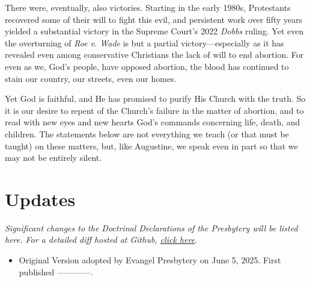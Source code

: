 \documentclass[
]{book}
\providecommand{\tightlist}{%
  \setlength{\itemsep}{0pt}\setlength{\parskip}{0pt}}
\begin{document}
There were, eventually, also victories. Starting in the early 1980s, Protestants recovered some of their will to fight this evil, and persistent work over fifty years yielded a substantial victory in the Supreme Court's 2022 \emph{Dobbs} ruling. Yet even the overturning of \emph{Roe v. Wade} is but a partial victory---especially as it has revealed even among conservative Christians the lack of will to end abortion. For even as we, God's people, have opposed abortion, the blood has continued to stain our country, our streets, even our homes.

Yet God is faithful, and He has promised to purify His Church with the truth. So it is our desire to repent of the Church's failure in the matter of abortion, and to read with new eyes and new hearts God's commands concerning life, death, and children. The statements below are not everything we teach (or that must be taught) on these matters, but, like Augustine, we speak even in part so that we may not be entirely silent.

\hypertarget{updates}{%
\chapter*{Updates}\label{updates}}

\emph{Significant changes to the Doctrinal Declarations of the Presbytery will be listed here. For a detailed diff hosted at Github, \href{https://github.com/Evangel-Presbytery/evangel-ddp}{click here}.}

\begin{itemize}
\tightlist
\item
  Original Version adopted by Evangel Presbytery on June 5, 2025. First published ------------.
\end{itemize}
\end{document}
